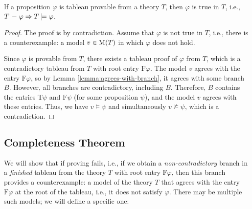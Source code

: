 \begin{theorem}[Soundness]
If a proposition $\varphi$ is tableau provable from a theory $T$, then $\varphi$ is true in $T$, i.e., $T \proves \varphi \Rightarrow T \models \varphi$.    
\end{theorem}

\begin{proof}
The proof is by contradiction. Assume that $\varphi$ is not true in $T$, i.e., there is a counterexample: a model $v \in \operatorname{M}(T)$ in which $\varphi$ does not hold.

Since $\varphi$ is provable from $T$, there exists a tableau proof of $\varphi$ from $T$, which is a contradictory tableau from $T$ with root entry $\mathrm{F}\varphi$. The model $v$ agrees with the entry $\mathrm{F}\varphi$, so by Lemma \ref{lemma:agrees-with-branch}, it agrees with some branch $B$. However, all branches are contradictory, including $B$. Therefore, $B$ contains the entries $\mathrm{T}\psi$ and $\mathrm{F}\psi$ (for some proposition $\psi$), and the model $v$ agrees with these entries. Thus, we have $v \models \psi$ and simultaneously $v \not\models \psi$, which is a contradiction.
\end{proof}

\subsection{Completeness Theorem}

We will show that if proving fails, i.e., if we obtain a \emph{non-contradictory} branch in a \emph{finished} tableau from the theory $T$ with root entry $\mathrm{F}\varphi$, then this branch provides a counterexample: a model of the theory $T$ that agrees with the entry $\mathrm{F}\varphi$ at the root of the tableau, i.e., it does not satisfy $\varphi$. There may be multiple such models; we will define a specific one:

